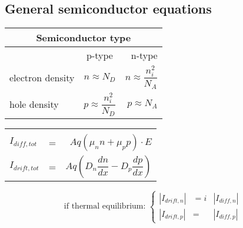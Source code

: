 \documentclass{article}
\begin{document}
\subsection*{General semiconductor equations}
\begin{minipage}[t]{0.5\linewidth}
\vspace{0pt}
\setlength{\fboxsep}{0pt}
\setlength{\fboxrule}{0.5pt}
\hfill
\begin{minipage}[t]{0.7\linewidth}
\vspace{0pt}
\centering
\begin{tabular}{lcr}
    \multicolumn{3}{c}{Semiconductor type} \\
    \toprule
    & p-type & n-type \\
    \midrule
    electron density & $n\approx N_D$ & $n\approx\dfrac{n_i^2}{N_A}$ \\[0.4cm]
    hole density     & $p\approx\dfrac{n_i^2}{N_D}$ & $p\approx N_A$ \\[0.4cm]
    \bottomrule
\end{tabular}
\end{minipage}

\begin{minipage}[t]{\textwidth}
\vspace{16pt}
\centering
\begin{tabular}{lcr}
    \toprule
    \\[-8pt]
    $I_{diff,tot}$ &=& $Aq(\mu_n n+\mu_p p)\cdot E$ \\[0.4cm]
    $I_{drift,tot}$ &=& $Aq\left(D_n\dfrac{dn}{dx}-D_p\dfrac{dp}{dx}\right)$ \\[0.4cm]
    \bottomrule
\end{tabular}
\vspace{10pt}
$$
\mbox{if thermal equilibrium: }
\left\{
\begin{array}{rcl}
|I_{drift,n}|&=i&|I_{diff,n}| \\[0.4cm]
|I_{drift,p}|&=&|I_{diff,p}|
\end{array}
\right.
$$
\end{minipage}
\end{minipage}
\end{document}
